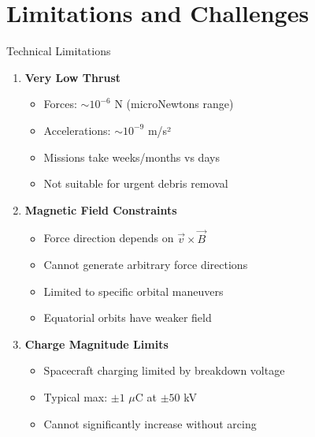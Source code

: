 \documentclass[aspectratio=169]{beamer}
\begin{document}
\section{Limitations and Challenges}

\begin{frame}{Technical Limitations}
\begin{enumerate}
    \item \textbf{Very Low Thrust}
    \begin{itemize}
        \item Forces: $\sim 10^{-6}$ N (microNewtons range)
        \item Accelerations: $\sim 10^{-9}$ m/s²
        \item Missions take weeks/months vs days
        \item Not suitable for urgent debris removal
    \end{itemize}

    \item \textbf{Magnetic Field Constraints}
    \begin{itemize}
        \item Force direction depends on $\vec{v} \times \vec{B}$
        \item Cannot generate arbitrary force directions
        \item Limited to specific orbital maneuvers
        \item Equatorial orbits have weaker field
    \end{itemize}

    \item \textbf{Charge Magnitude Limits}
    \begin{itemize}
        \item Spacecraft charging limited by breakdown voltage
        \item Typical max: $\pm 1$ $\mu$C at $\pm 50$ kV
        \item Cannot significantly increase without arcing
    \end{itemize}
\end{enumerate}
\end{frame}
\end{document}
